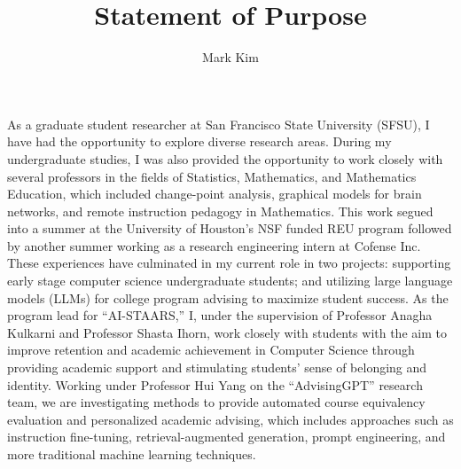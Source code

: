 \documentclass[12pt]{article}
\author{Mark Kim}
\title{Statement of Purpose}
\begin{document}
\maketitle


As a graduate student researcher at San Francisco State University (SFSU), I have had the opportunity to explore diverse research areas.
During my undergraduate studies, I was also provided the opportunity to work closely with several professors in the fields of Statistics,
Mathematics, and Mathematics Education, which included change-point analysis, graphical models for brain networks, and remote instruction
pedagogy in Mathematics. This work segued into a summer at the University of Houston's NSF funded REU program followed by another summer
working as a research engineering intern at Cofense Inc. These experiences have culminated in my current role in two projects: supporting
early stage computer science undergraduate students; and utilizing large language models (LLMs) for college program advising to maximize
student success. As the program lead for ``AI-STAARS,'' I, under the supervision of Professor Anagha Kulkarni and Professor Shasta Ihorn,
work closely with students with the aim to improve retention and academic achievement in Computer Science through providing academic support
and stimulating students' sense of belonging and identity. Working under Professor Hui Yang on the ``AdvisingGPT'' research team, we are
investigating methods to provide automated course equivalency evaluation and personalized academic advising, which includes approaches such
as instruction fine-tuning, retrieval-augmented generation, prompt engineering, and more traditional machine learning techniques.
\end{document}
